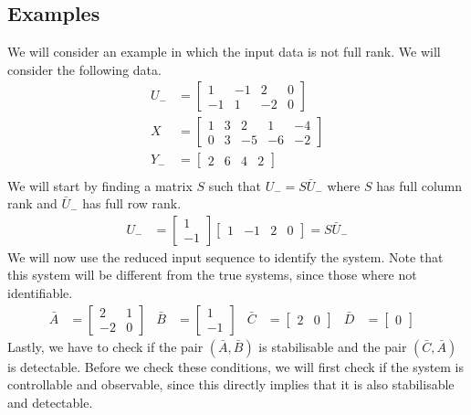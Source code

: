\subsection{Examples}
We will consider an example in which the input data is not full rank. We will consider the following data.
\begin{align*}
	U_- &= \begin{bmatrix} 1&-1&2&0\\-1&1&-2&0 \end{bmatrix} \\
	X &= \begin{bmatrix} 1&3&2&1&-4\\0&3&-5&-6&-2 \end{bmatrix} \\
	Y_- &= \begin{bmatrix} 2&6&4&2 \end{bmatrix} \\
\end{align*}
We will start by finding a matrix $S$ such that $U_- = S \bar{U}_-$ where $S$ has full column rank and $\bar{U}_-$ has full row rank.
\begin{align*}
	U_- &= \begin{bmatrix} 1 \\ -1 \end{bmatrix} \begin{bmatrix} 1&-1&2&0 \end{bmatrix} = S\bar{U}_-
\end{align*}
We will now use the reduced input sequence to identify the system. Note that this system will be different from the true systems, since those where not identifiable. 
\begin{align*}
\bar{A} &= \begin{bmatrix} 2&1\\-2&0 \end{bmatrix} &
\bar{B} &= \begin{bmatrix} 1\\-1 \end{bmatrix} &
\bar{C} &= \begin{bmatrix} 2&0 \end{bmatrix} &
\bar{D} &= \begin{bmatrix} 0 \end{bmatrix} &
\end{align*}
Lastly, we have to check if the pair $(\bar{A},\bar{B})$ is stabilisable and the pair $(\bar{C},\bar{A})$ is detectable. Before we check these conditions, we will first check if the system is controllable and observable, since this directly implies that it is also stabilisable and detectable.

